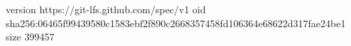 version https://git-lfs.github.com/spec/v1
oid sha256:06465f99439580c1583ebf2f890c2668357458fd106364e68622d317fae24be1
size 399457
